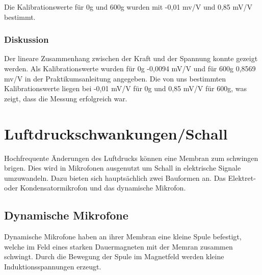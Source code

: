 \documentclass[12pt,a4paper]{article}
\begin{document}
Die Kalibrationswerte für 0g und 600g wurden mit -0,01 mv/V und 0,85 mV/V bestimmt.

\subsubsection*{Diskussion}

Der lineare Zusammenhang zwischen der Kraft und der Spannung konnte gezeigt werden. Als Kalibrationswerte wurden für 0g -0,0094 mV/V und für 600g 0,8569 mv/V in der Praktikumsanleitung angegeben. Die von uns bestimmten Kalibrationswerte liegen bei -0,01 mV/V für 0g und 0,85 mV/V für 600g, was zeigt, dass die Messung erfolgreich war.

\section{Luftdruckschwankungen/Schall}
Hochfrequente Änderungen des Luftdrucks können eine Membran zum schwingen brigen. Dies wird in Mikrofonen ausgenutzt um Schall in elektrische Signale umzuwandeln. Dazu bieten sich hauptsächlich zwei Bauformen an. Das Elektret- oder Kondensatormikrofon und das dynamische Mikrofon.
\subsection{Dynamische Mikrofone}
Dynamische Mikrofone haben an ihrer Membran eine kleine Spule befestigt, welche im Feld eines starken Dauermagneten mit der Memran zusammen schwingt. Durch die Bewegung der Spule im Magnetfeld werden kleine Induktionsspannungen erzeugt.
\end{document}

